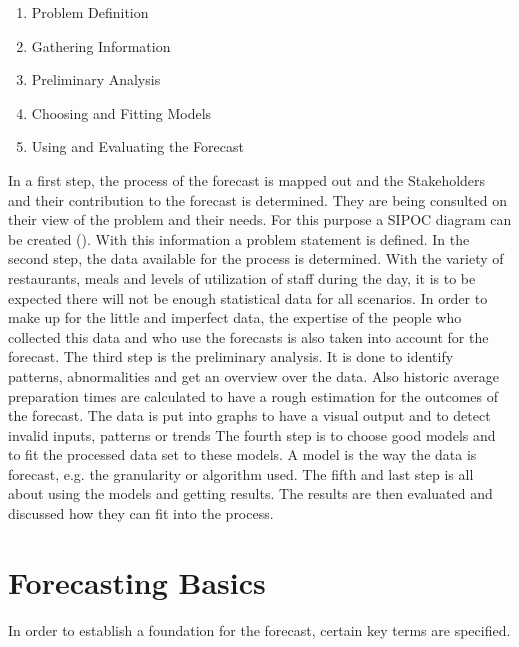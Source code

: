 \begin{enumerate}
\item Problem Definition
\item Gathering Information
\item Preliminary Analysis
\item Choosing and Fitting Models
\item Using and Evaluating the Forecast
\end{enumerate}

In a first step, the process of the forecast is mapped out and the Stakeholders and their contribution to the forecast is determined. They are being consulted on their view of the problem and their needs. For this purpose a SIPOC diagram can be created (\cite{SIPOC}). With this information a problem statement is defined.\newline
In the second step, the data available for the process is determined. With the variety of restaurants, meals and levels of utilization of staff during the day, it is to be expected there will not be enough statistical data for all scenarios. In order to make up for the little and imperfect data, the expertise of the people who collected this data and who use the forecasts is also taken into account for the forecast.\newline
The third step is the preliminary analysis. It is done to identify patterns, abnormalities and get an overview over the data. Also historic average preparation times are calculated to have a rough estimation for the outcomes of the forecast. The data is put into graphs to have a visual output and to detect invalid inputs, patterns or trends\newline
The fourth step is to choose good models and to fit the processed data set to these models. A model is the way the data is forecast, e.g. the granularity or algorithm used.\newline
The fifth and last step is all about using the models and getting results. The results are then evaluated and discussed how they can fit into the process.
\section{Forecasting Basics}\label{section:Forecast Basics}
In order to establish a foundation for the forecast, certain key terms are specified.
